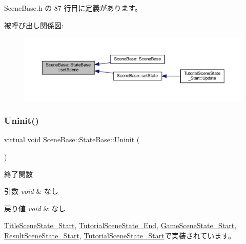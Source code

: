  Scene\+Base.\+h の 87 行目に定義があります。

被呼び出し関係図\+:
\nopagebreak
\begin{figure}[H]
\begin{center}
\leavevmode
\includegraphics[width=350pt]{class_scene_base_1_1_state_base_adfb19da59b938832387aa10528bedb44_icgraph}
\end{center}
\end{figure}
\mbox{\label{class_scene_base_1_1_state_base_a2763fa37e45b39bd8d3bbb735c76c59b}} 
\subsubsection{\texorpdfstring{Uninit()}{Uninit()}}
{\footnotesize\ttfamily virtual void Scene\+Base\+::\+State\+Base\+::\+Uninit (\begin{DoxyParamCaption}{ }\end{DoxyParamCaption})\hspace{0.3cm}{\ttfamily [pure virtual]}}



終了関数 


\begin{DoxyParams}{引数}
{\em void} & なし \\
\hline
\end{DoxyParams}

\begin{DoxyRetVals}{戻り値}
{\em void} & なし \\
\hline
\end{DoxyRetVals}


\mbox{\hyperlink{class_title_scene_state___start_a5bcb4d7a9250ea1c0041c38616ffabfe}{Title\+Scene\+State\+\_\+\+Start}}, \mbox{\hyperlink{class_tutorial_scene_state___end_aafc0d8d042de8c7f79d84fcdc35a807c}{Tutorial\+Scene\+State\+\_\+\+End}}, \mbox{\hyperlink{class_game_scene_state___start_a636df8b7ac0173b044b0efc2927fb83b}{Game\+Scene\+State\+\_\+\+Start}}, \mbox{\hyperlink{class_result_scene_state___start_af5b9af607074e3296481a1660607fb9a}{Result\+Scene\+State\+\_\+\+Start}}, \mbox{\hyperlink{class_tutorial_scene_state___start_a974962addfb0bcba90fbab64ac6d50f0}{Tutorial\+Scene\+State\+\_\+\+Start}}で実装されています。

